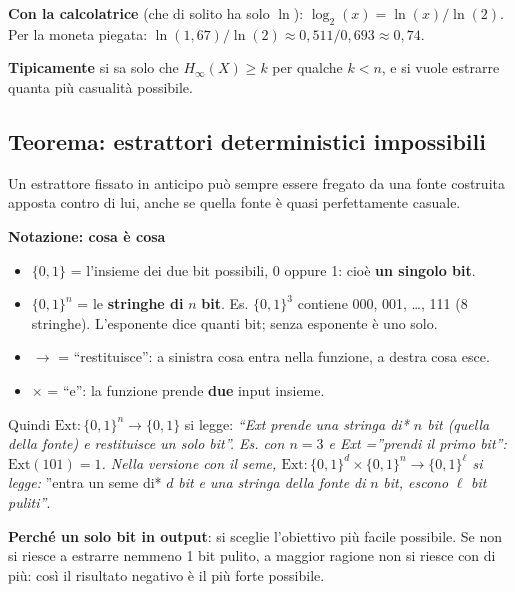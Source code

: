 \textbf{Con la calcolatrice} (che di solito ha solo \(\ln\)): \(\log_2(x) = \ln(x) / \ln(2)\). Per la moneta piegata: \(\ln(1{,}67) / \ln(2) \approx 0{,}511 / 0{,}693 \approx 0{,}74\).

\textbf{Tipicamente} si sa solo che \(H_\infty(X) \ge k\) per qualche \(k < n\), e si vuole estrarre quanta più casualità possibile.

\subsection{Teorema: estrattori deterministici impossibili}

\begin{inbreve}

Un estrattore fissato in anticipo può sempre essere fregato da una fonte costruita apposta contro di lui, anche se quella fonte è quasi perfettamente casuale.

\end{inbreve}

\begin{nota}

\textbf{Notazione: cosa è cosa}

\begin{itemize}
\tightlist
\item
  \(\{0,1\}\) = l'insieme dei due bit possibili, 0 oppure 1: cioè \textbf{un singolo bit}.
\item
  \(\{0,1\}^n\) = le \textbf{stringhe di} \(n\) \textbf{bit}. Es. \(\{0,1\}^3\) contiene 000, 001, \ldots, 111 (8 stringhe). L'esponente dice quanti bit; senza esponente è uno solo.
\item
  \(\to\) = ``restituisce'': a sinistra cosa entra nella funzione, a destra cosa esce.
\item
  \(\times\) = ``e'': la funzione prende \textbf{due} input insieme.
\end{itemize}

Quindi \(\text{Ext}: \{0,1\}^n \to \{0,1\}\) si legge: \emph{``Ext prende una stringa di* \(n\) \emph{bit (quella della fonte) e restituisce un solo bit''}. Es. con \(n = 3\) e Ext =''prendi il primo bit'': \(\text{Ext}(101) = 1\).
Nella versione con il seme, \(\text{Ext}: \{0,1\}^d \times \{0,1\}^n \to \{0,1\}^\ell\) si legge: }''entra un seme di* \(d\) \emph{bit e una stringa della fonte di} \(n\) \emph{bit, escono} \(\ell\) \emph{bit puliti''}.

\end{nota}

\textbf{Perché un solo bit in output}: si sceglie l'obiettivo più facile possibile. Se non si riesce a estrarre nemmeno 1 bit pulito, a maggior ragione non si riesce con di più: così il risultato negativo è il più forte possibile.

